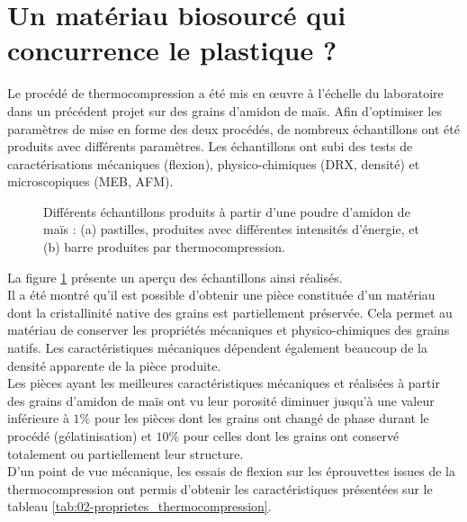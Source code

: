 \section*{Un matériau biosourcé qui concurrence le plastique ?}
Le procédé de thermocompression a été mis en \oe{}uvre à l'échelle du laboratoire dans un précédent projet \citep{regazzi_forming_2015, regazzi_microstructural_2019, regazzi_effectiveness_2016} sur des grains d'amidon de maïs. Afin d'optimiser les paramètres de mise en forme des deux procédés, de nombreux échantillons ont été produits avec différents paramètres. Les échantillons ont subi des tests de caractérisations mécaniques (flexion), physico-chimiques (DRX, densité) et microscopiques (MEB, AFM).
\begin{figure}\centering
	\caption{\label{fig:02-echantillons_amidon}Différents échantillons produits à partir d'une poudre d'amidon de maïs : (a) pastilles, produites avec différentes intensités d'énergie, et (b) barre produites par thermocompression.}
\end{figure}
La figure \ref{fig:02-echantillons_amidon} présente un aperçu des échantillons ainsi réalisés.
\\Il a été montré \citep{regazzi_effectiveness_2016} qu'il est possible d'obtenir une pièce constituée d'un matériau dont la cristallinité native des grains est partiellement préservée. Cela permet au matériau de conserver les propriétés mécaniques et physico-chimiques des grains natifs. Les caractéristiques mécaniques dépendent également beaucoup de la densité apparente de la pièce produite.
\\Les pièces ayant les meilleures caractéristiques mécaniques et réalisées à partir des grains d'amidon de maïs ont vu leur porosité diminuer jusqu'à une valeur inférieure à $1\%$ pour les pièces dont les grains ont changé de phase durant le procédé (gélatinisation) et $10\%$ pour celles dont les grains ont conservé totalement ou partiellement leur structure.
\\D'un point de vue mécanique, les essais de flexion sur les éprouvettes issues de la thermocompression ont permis d'obtenir les caractéristiques présentées sur le tableau \ref{tab:02-proprietes_thermocompression}.
